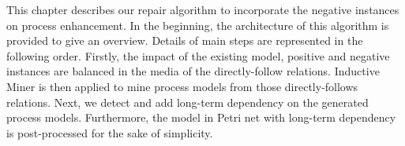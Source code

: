 

This chapter describes our repair algorithm to incorporate the negative instances on process enhancement. In the beginning, the architecture of this algorithm is provided to give an overview. Details of main steps are represented in the following order. Firstly, the impact of the existing model, positive and negative instances are balanced in the media of the directly-follow relations. Inductive Miner is then applied to mine process models from those directly-follows relations. Next, we detect and add long-term dependency on the generated process models. Furthermore, the model in Petri net with long-term dependency is  post-processed for the sake of simplicity. 
